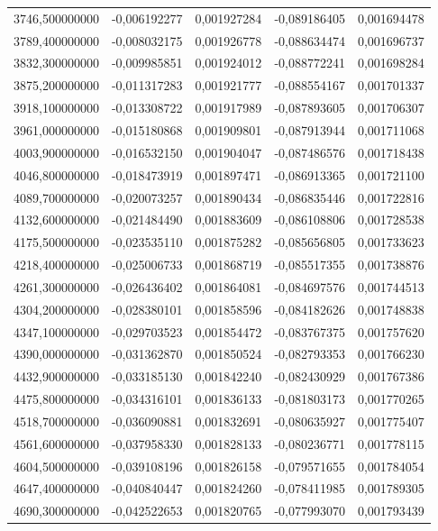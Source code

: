 \begin{longtable}{rrrrr}
3746,500000000 & -0,006192277 & 0,001927284 & -0,089186405 & 0,001694478\\
3789,400000000 & -0,008032175 & 0,001926778 & -0,088634474 & 0,001696737\\
3832,300000000 & -0,009985851 & 0,001924012 & -0,088772241 & 0,001698284\\
3875,200000000 & -0,011317283 & 0,001921777 & -0,088554167 & 0,001701337\\
3918,100000000 & -0,013308722 & 0,001917989 & -0,087893605 & 0,001706307\\
3961,000000000 & -0,015180868 & 0,001909801 & -0,087913944 & 0,001711068\\
4003,900000000 & -0,016532150 & 0,001904047 & -0,087486576 & 0,001718438\\
4046,800000000 & -0,018473919 & 0,001897471 & -0,086913365 & 0,001721100\\
4089,700000000 & -0,020073257 & 0,001890434 & -0,086835446 & 0,001722816\\
4132,600000000 & -0,021484490 & 0,001883609 & -0,086108806 & 0,001728538\\
4175,500000000 & -0,023535110 & 0,001875282 & -0,085656805 & 0,001733623\\
4218,400000000 & -0,025006733 & 0,001868719 & -0,085517355 & 0,001738876\\
4261,300000000 & -0,026436402 & 0,001864081 & -0,084697576 & 0,001744513\\
4304,200000000 & -0,028380101 & 0,001858596 & -0,084182626 & 0,001748838\\
4347,100000000 & -0,029703523 & 0,001854472 & -0,083767375 & 0,001757620\\
4390,000000000 & -0,031362870 & 0,001850524 & -0,082793353 & 0,001766230\\
4432,900000000 & -0,033185130 & 0,001842240 & -0,082430929 & 0,001767386\\
4475,800000000 & -0,034316101 & 0,001836133 & -0,081803173 & 0,001770265\\
4518,700000000 & -0,036090881 & 0,001832691 & -0,080635927 & 0,001775407\\
4561,600000000 & -0,037958330 & 0,001828133 & -0,080236771 & 0,001778115\\
4604,500000000 & -0,039108196 & 0,001826158 & -0,079571655 & 0,001784054\\
4647,400000000 & -0,040840447 & 0,001824260 & -0,078411985 & 0,001789305\\
4690,300000000 & -0,042522653 & 0,001820765 & -0,077993070 & 0,001793439\\

\end{longtable}
